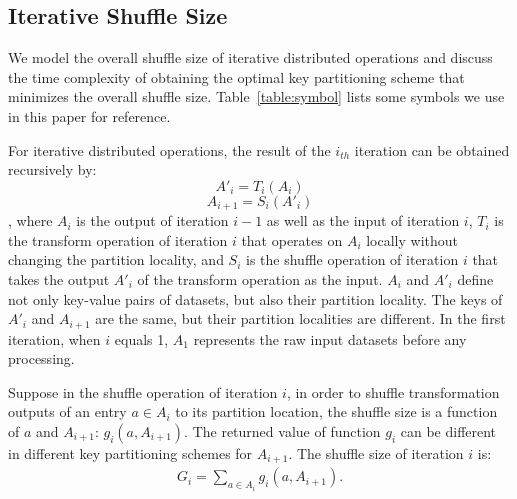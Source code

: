 \documentclass[10pt,journal,compsoc]{IEEEtran}
\begin{document}



\subsection{Iterative Shuffle Size}\label{section:model}
We model the overall shuffle size of iterative
distributed operations and discuss the time complexity of obtaining
the optimal key partitioning scheme that minimizes the overall shuffle
size. Table~\ref{table:symbol} lists some symbols we use in this paper
for reference. 

For iterative distributed operations, the result of the $i_{th}$ iteration can be obtained recursively by:
\begin{equation*}\label{eq:t}
A'_i=T_i(A_i)
\end{equation*}
\begin{equation*}\label{eq:s}
A_{i+1}=S_i(A'_i)
\end{equation*}
, where $A_i$ is the output of iteration $i-1$ as well as the input of iteration $i$, 
$T_i$ is the transform operation of iteration $i$ that operates on $A_i$ locally without changing the partition locality, 
and $S_i$ is the shuffle operation of iteration $i$ that takes the output $A'_i$ of the transform operation as the input.  
$A_i$ and $A'_i$ define not only key-value pairs of datasets, but also their partition locality. 
The keys of $A'_i$ and $A_{i+1}$ are the same, but their partition localities are different. 
In the first iteration, when $i$ equals 1, 
$A_1$ represents the raw input datasets before any processing.  

Suppose in the shuffle operation of iteration $i$, in order to shuffle transformation outputs of an entry $a \in A_i$ to its partition location, 
the shuffle size is a function of $a$ and $A_{i+1}$: $g_i(a,A_{i+1})$. 
The returned value of function $g_i$ can be different in different key partitioning schemes for $A_{i+1}$. 
The shuffle size of iteration $i$ is: 
\begin{equation*}\label{eq:gi}
\begin{aligned}
G_i=\sum_{a \in A_i} g_i(a,A_{i+1}).
\end{aligned}
\end{equation*}
\end{document}
